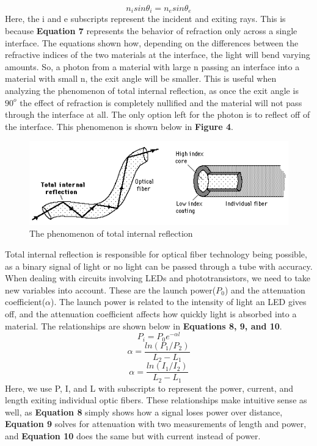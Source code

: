 \documentclass{article}
\begin{document}
\begin{equation}
n_isin\theta_i = n_esin\theta_e
\end{equation}
Here, the i and e subscripts represent the incident and exiting rays. This is because \textbf{Equation 7} represents the behavior of refraction only across a single interface. The equations shown how, depending on the differences between the refractive indices of the two materials at the interface, the light will bend varying amounts. So, a photon from a material with large n passing an interface into a material with small n, the exit angle will be smaller. This is useful when analyzing the phenomenon of total internal reflection, as once the exit angle is $90^o$ the effect of refraction is completely nullified and the material will not pass through the interface at all. The only option left for the photon is to reflect off of the interface. This phenomenon is shown below in \textbf{Figure 4}.
\begin{figure}[h!]
\centering
\includegraphics[scale=.8]{totalinternal.png}
\caption{The phenomenon of total internal reflection}
\end{figure}

Total internal reflection is responsible for optical fiber technology being possible, as a binary signal of light or no light can be passed through a tube with accuracy.\\

When dealing with circuits involving LEDs and phototransistors, we need to take new variables into account. These are the launch power($P_0$) and the attenuation coefficient($\alpha$). The launch power is related to the intensity of light an LED gives off, and the attenuation coefficient affects how quickly light is absorbed into a material. The relationships are shown below in \textbf{Equations 8, 9, and 10}.
\begin{equation}
P_i = P_0 e^{-\alpha l}
\end{equation}
\begin{equation}
\alpha = \frac{ln(P_1/P_2)}{L_2-L_1}
\end{equation}
\begin{equation}
\alpha = \frac{ln(I_1/I_2)}{L_2-L_1}
\end{equation}
Here, we use P, I, and L with subscripts to represent the power, current, and length exiting individual optic fibers. These relationships make intuitive sense as well, as \textbf{Equation 8} simply shows how a signal loses power over distance, \textbf{Equation 9} solves for attenuation with two measurements of length and power, and \textbf{Equation 10} does the same but with current instead of power.
\end{document}

